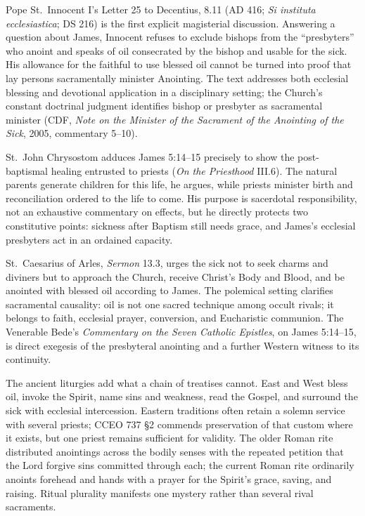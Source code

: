 Pope St.~Innocent I's Letter 25 to Decentius, 8.11 (AD 416; \emph{Si instituta ecclesiastica}; DS 216) is the first explicit magisterial discussion. Answering a question about James, Innocent refuses to exclude bishops from the ``presbyters'' who anoint and speaks of oil consecrated by the bishop and usable for the sick. His allowance for the faithful to use blessed oil cannot be turned into proof that lay persons sacramentally minister Anointing. The text addresses both ecclesial blessing and devotional application in a disciplinary setting; the Church's constant doctrinal judgment identifies bishop or presbyter as sacramental minister (CDF, \emph{Note on the Minister of the Sacrament of the Anointing of the Sick}, 2005, commentary 5--10).

St.~John Chrysostom adduces James 5:14--15 precisely to show the post-baptismal healing entrusted to priests (\emph{On the Priesthood} III.6). The natural parents generate children for this life, he argues, while priests minister birth and reconciliation ordered to the life to come. His purpose is sacerdotal responsibility, not an exhaustive commentary on effects, but he directly protects two constitutive points: sickness after Baptism still needs grace, and James's ecclesial presbyters act in an ordained capacity.

St.~Caesarius of Arles, \emph{Sermon} 13.3, urges the sick not to seek charms and diviners but to approach the Church, receive Christ's Body and Blood, and be anointed with blessed oil according to James. The polemical setting clarifies sacramental causality: oil is not one sacred technique among occult rivals; it belongs to faith, ecclesial prayer, conversion, and Eucharistic communion. The Venerable Bede's \emph{Commentary on the Seven Catholic Epistles}, on James 5:14--15, is direct exegesis of the presbyteral anointing and a further Western witness to its continuity.

The ancient liturgies add what a chain of treatises cannot. East and West bless oil, invoke the Spirit, name sins and weakness, read the Gospel, and surround the sick with ecclesial intercession. Eastern traditions often retain a solemn service with several priests; CCEO 737 \S2 commends preservation of that custom where it exists, but one priest remains sufficient for validity. The older Roman rite distributed anointings across the bodily senses with the repeated petition that the Lord forgive sins committed through each; the current Roman rite ordinarily anoints forehead and hands with a prayer for the Spirit's grace, saving, and raising. Ritual plurality manifests one mystery rather than several rival sacraments.

